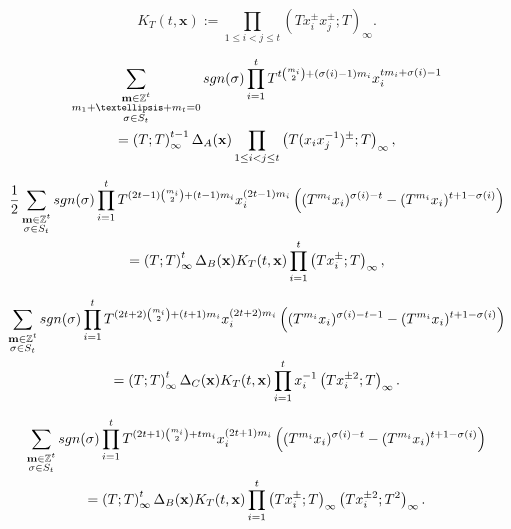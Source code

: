 \documentclass[10pt,a4paper]{amsart}
\def\bbbz{\mathbb Z}
\def\sgn{{\rm sgn}}
\begin{document}
\begin{equation}\label{eq:kt}
 K_T(t,\mathbf{x}):=\prod_{1\leq i<j\leq t}\left(Tx_i^{\pm} x_j^{\pm};T\right)_\infty.
\end{equation}

\begin{multline}\label{eq:macdoAstart}
\sum_{\substack{\mathbf{m}\in\bbbz^t\\m_1+\dots+m_t=0\\\sigma\in S_t}}\sgn(\sigma)\prod_{i=1}^tT^{t\binom{m_i}{2}+(\sigma(i)-1)m_i}x_i^{tm_i+\sigma(i)-1}
\\ =\left(T;T\right)_\infty^{t-1}\Delta_A(\mathbf{x}) \prod_{1\le i<j\le t}\left(T(x_ix_j^{-1})^{\pm};T\right)_\infty,
\end{multline}

\begin{multline}\label{eq:macdoBstart}
\frac{1}{2}\sum_{\substack{\mathbf{m}\in\bbbz^t\\\sigma\in S_t}}\sgn(\sigma)\prod_{i=1}^tT^{(2t-1)\binom{m_i}{2}+(t-1)m_i}x_i^{(2t-1)m_i}
\left((T^{m_i}x_i)^{\sigma(i)-t}-(T^{m_i}x_i)^{t+1-\sigma(i)}\right)\\
=\left(T;T\right)_\infty^{t}\Delta_B(\mathbf{x}) K_T(t,\mathbf{x})\prod_{i=1}^t \left(Tx_i^{\pm};T\right)_\infty,
\end{multline}

\begin{multline}\label{eq:macdostart}
\sum_{\substack{\mathbf{m}\in\bbbz^t\\\sigma\in S_t}}\sgn(\sigma)\prod_{i=1}^tT^{(2t+2)\binom{m_i}{2}+(t+1)m_i}x_i^{(2t+2)m_i}
\left((T^{m_i}x_i)^{\sigma(i)-t-1}-(T^{m_i}x_i)^{t+1-\sigma(i)}\right)\\
=\left(T;T\right)_\infty^{t}\Delta_C(\mathbf{x}) K_T(t,\mathbf{x})\prod_{i=1}^t x_i^{-1}\left(Tx_i^{\pm 2};T\right)_\infty.
\end{multline}

\begin{multline}\label{eq:macdoBCstart}
\sum_{\substack{\mathbf{m}\in\bbbz^t\\\sigma\in S_t}}\sgn(\sigma)\prod_{i=1}^tT^{(2t+1)\binom{m_i}{2}+tm_i}x_i^{(2t+1)m_i}
\left((T^{m_i}x_i)^{\sigma(i)-t}-(T^{m_i}x_i)^{t+1-\sigma(i)}\right)\\=\left(T;T\right)_\infty^{t}\Delta_B(\mathbf{x}) K_T(t,\mathbf{x})\prod_{i=1}^t\left(Tx_i^{\pm};T\right)_\infty\left(Tx_i^{\pm 2};T^2\right)_\infty.
\end{multline}
\end{document}
